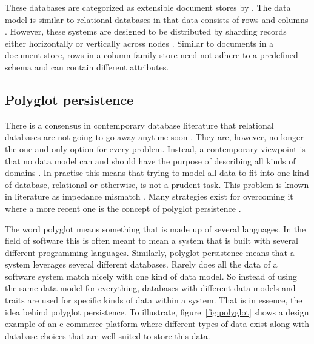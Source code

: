 These databases are categorized as extensible document stores by \cite{Catell}. The data model is similar to relational databases in that data consists of rows and columns \cite{Catell}. However, these systems are designed to be distributed by sharding records either horizontally or vertically across nodes \cite{10rules}. Similar to documents in a document-store, rows in a column-family store need not adhere to a predefined schema and can contain different attributes. 


\subsection{Polyglot persistence}
\label{sec:pp}
There is a consensus in contemporary database literature that relational databases are not going to go away anytime soon \cite{Catell, NoSQLDistilled, NoSQLSurvey}. They are, however, no longer the one and only option for every problem. Instead, a contemporary viewpoint is that no data model can and should have the purpose of describing all kinds of domains \cite{NoSQLDistilled, NoSQLSurvey}. In practise this means that trying to model all data to fit into one kind of database, relational or otherwise, is not a prudent task. This problem is known in literature as impedance mismatch \cite{ORM}. Many strategies \cite{ORM} exist for overcoming it where a more recent one is the concept of polyglot persistence \cite{NoSQLDistilled}. 

The word polyglot means something that is made up of several languages. In the field of software this is often meant to mean a system that is built with several different programming languages. Similarly, polyglot persistence means that a system leverages several different databases. Rarely does all the data of a software system match nicely with one kind of data model. So instead of using the same data model for everything, databases with different data models and traits are used for specific kinds of data within a system. That is in essence, the idea behind polyglot persistence. To illustrate, figure~\ref{fig:polyglot} shows a design example of an e-commerce platform where different types of data exist along with database choices that are well suited to store this data.


